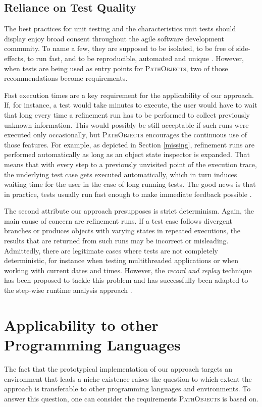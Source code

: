 \subsection{Reliance on Test Quality} 
\label{ss:LimitationsTestQuality}
The best practices for unit testing and the characteristics unit tests should display enjoy broad consent throughout the agile software development community.
To name a few, they are supposed to be isolated, to be free of side-effects, to run fast, and to be reproducible, automated and unique \cite{meszaros_xunit_2006, beck_test_2002}.
However, when tests are being used as entry points for \textsc{PathObjects}, two of those recommendations become requirements.

Fast execution times are a key requirement for the applicability of our approach.
If, for instance, a test would take minutes to execute, the user would have to wait that long every time a refinement run has to be performed to collect previously unknown information.
This would possibly be still acceptable if such runs were executed only occasionally, but \textsc{PathObjects} encourages the continuous use of those features.
For example, as depicted in Section \ref{missing}, refinement runs are performed automatically as long as an object state inspector is expanded.
That means that with every step to a previously unvisited point of the execution trace, the underlying test case gets executed automatically, which in turn induces waiting time for the user in the case of long running tests. The good news is that in practice, tests usually run fast enough to make immediate feedback possible \cite{perscheid_immediacy_2010}.

The second attribute our approach presupposes is strict determinism.
Again, the main cause of concern are refinement runs.
If a test case follows divergent branches or produces objects with varying states in repeated executions, the results that are returned from such runs may be incorrect or misleading.
Admittedly, there are legitimate cases where tests are not completely deterministic, for instance when testing multithreaded applications or when working with current dates and times.
However, the \emph{record and replay} technique has been proposed to tackle this problem \cite{choi_deterministic_1998} and has successfully been adapted to the step-wise runtime analysis approach \cite{felgentreff_comparison_2012}.

\section{Applicability to other Programming Languages}
\label{s:DiscussionApplicability}
The fact that the prototypical implementation of our approach targets an environment that leads a niche existence raises the question to which extent the approach is transferable to other programming languages and environments.
To answer this question, one can consider the requirements \textsc{PathObjects} is based on.

